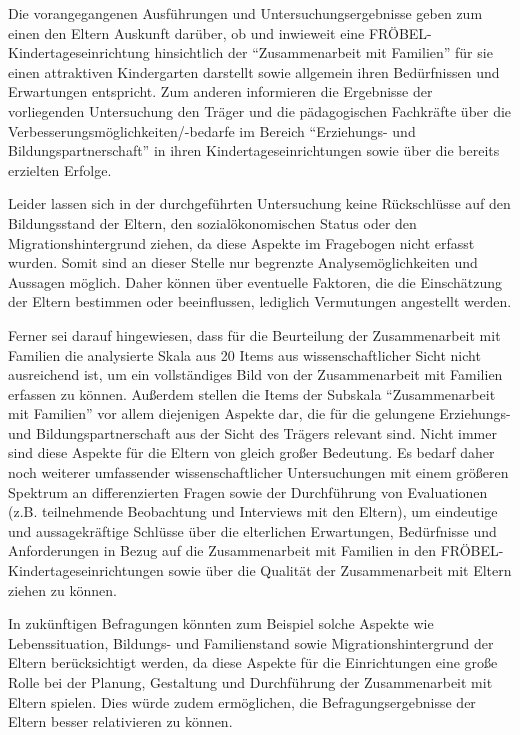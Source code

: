 \documentclass[12pt,a4paper]{article}
\begin{document}
	 Die vorangegangenen Ausführungen und Untersuchungsergebnisse geben zum einen den Eltern Auskunft darüber, ob und inwieweit eine FRÖBEL-Kindertageseinrichtung hinsichtlich der "`Zusammenarbeit mit Familien"' für sie einen attraktiven Kindergarten darstellt sowie allgemein ihren Bedürfnissen und Erwartungen entspricht. Zum anderen informieren die Ergebnisse der vorliegenden Untersuchung den Träger und die pädagogischen Fachkräfte über die Verbesserungsmöglichkeiten/-bedarfe im Bereich "`Erziehungs- und Bildungspartnerschaft"' in ihren Kindertageseinrichtungen sowie über die bereits erzielten Erfolge.
	 
	Leider lassen sich in der durchgeführten Untersuchung keine Rückschlüsse auf den Bildungsstand der Eltern, den sozialökonomischen Status oder den Migrationshintergrund ziehen, da diese Aspekte im Fragebogen nicht erfasst wurden. Somit sind an dieser Stelle nur begrenzte Analysemöglichkeiten und Aussagen möglich. Daher können über eventuelle Faktoren, die die Einschätzung der Eltern bestimmen oder beeinflussen, lediglich Vermutungen angestellt  werden. 
	
	Ferner sei darauf hingewiesen, dass für die Beurteilung der Zusammenarbeit mit Familien die analysierte Skala aus 20 Items aus wissenschaftlicher Sicht nicht ausreichend ist, um ein vollständiges Bild von der Zusammenarbeit mit Familien erfassen zu können. Außerdem stellen die Items der Subskala "`Zusammenarbeit mit Familien"' vor allem diejenigen Aspekte dar, die für die gelungene Erziehungs- und Bildungspartnerschaft aus der Sicht des Trägers relevant sind. Nicht immer sind diese Aspekte für die Eltern von gleich großer Bedeutung. Es bedarf daher noch weiterer umfassender wissenschaftlicher Untersuchungen mit einem größeren Spektrum an differenzierten Fragen sowie der Durchführung von Evaluationen (z.B. teilnehmende Beobachtung und Interviews mit den Eltern), um eindeutige und aussagekräftige Schlüsse über die elterlichen Erwartungen, Bedürfnisse und Anforderungen in Bezug auf die Zusammenarbeit mit Familien in den FRÖBEL-Kindertageseinrichtungen sowie über die Qualität der Zusammenarbeit mit Eltern ziehen zu können. 
	
	In zukünftigen Befragungen könnten zum Beispiel solche Aspekte wie Lebenssituation, Bildungs- und Familienstand sowie Migrationshintergrund der Eltern berücksichtigt werden, da diese Aspekte für die Einrichtungen eine große Rolle bei der Planung, Gestaltung und Durchführung der Zusammenarbeit mit Eltern spielen. Dies würde zudem ermöglichen, die Befragungsergebnisse der Eltern besser relativieren zu können. 
\end{document}
